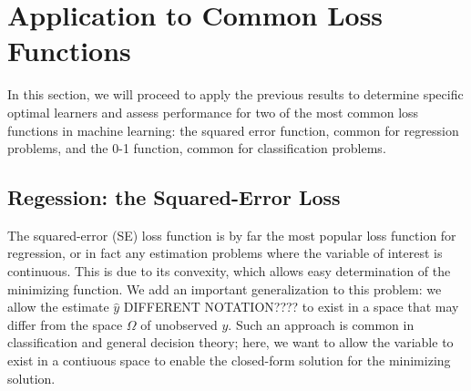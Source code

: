 \documentclass[12pt]{article}
\begin{document}
\section{Application to Common Loss Functions}

In this section, we will proceed to apply the previous results to determine specific optimal learners and assess performance for two of the most common loss functions in machine learning: the squared error function, common for regression problems, and the 0-1 function, common for classification problems. 

\subsection{Regession: the Squared-Error Loss}

The squared-error (SE) loss function is by far the most popular loss function for regression, or in fact any estimation problems where the variable of interest is continuous. This is due to its convexity, which allows easy determination of the minimizing function. We add an important generalization to this problem: we allow the estimate $\hat{y}$ DIFFERENT NOTATION???? to exist in a space that may differ from the space $\Omega$ of unobserved $y$. Such an approach is common in classification and general decision theory; here, we want to allow the variable to exist in a contiuous space to enable the closed-form solution for the minimizing solution.




\end{document}
